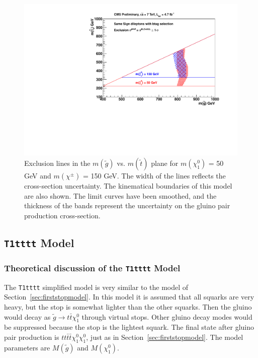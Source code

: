\begin{figure}[htb]
\begin{center}
\includegraphics[width=0.69\linewidth]{figs/GlStop_cheeseWedge.pdf}
\caption{Exclusion lines in the $m(\widetilde{g})$ vs. 
$m(\widetilde{t})$ plane
for $m(\chi_1^0)$ = 50 GeV and 
$m(\chi^{\pm})$ = 150 GeV.  The width of the lines
reflects the cross-section uncertainty.  The kinematical boundaries
of this model are also shown.
The limit curves have been smoothed, and the thickness of the
bands represent the uncertainty on the gluino pair production cross-section.
\label{fig:stop_cheese}}
\end{center}
\end{figure}



\clearpage


\subsection{{\tt T1tttt} Model}
\label{t1ttmodel}

\subsubsection{Theoretical discussion of the {\tt T1tttt} Model}
\label{sec:t1tttheory}
The {\tt T1tttt} simplified model\cite{T1tttt} is very similar to the model of 
Section~\ref{sec:firststopmodel}.  In this model it is assumed that all squarks 
are very heavy, but the stop is somewhat lighter than the other 
squarks\cite{stopVirtual}\cite{stopVirtualPRD}.
Then the gluino would decay as $\widetilde{g} \to t\bar{t}\chi_1^0$ through virtual stops.
Other gluino decay modes would be suppressed because the stop is the lightest squark.
The final state after gluino pair production is $tt\bar{t}\bar{t}\chi_1^0\chi_1^0$,
just as in Section~\ref{sec:firststopmodel}.
The model parameters are $M(\widetilde{g})$ and $M(\chi_1^0)$.



